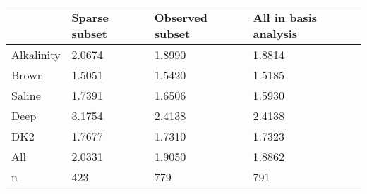 \begin{tabular}{llll}
\toprule
 & Sparse subset & Observed subset & All in basis analysis \\
\midrule
Alkalinity & 2.0674 & 1.8990 & 1.8814 \\
Brown & 1.5051 & 1.5420 & 1.5185 \\
Saline & 1.7391 & 1.6506 & 1.5930 \\
Deep & 3.1754 & 2.4138 & 2.4138 \\
DK2 & 1.7677 & 1.7310 & 1.7323 \\
All & 2.0331 & 1.9050 & 1.8862 \\
n & 423 & 779 & 791 \\
\bottomrule
\end{tabular}
